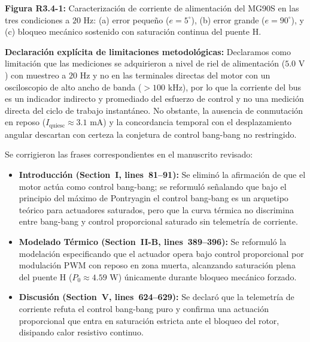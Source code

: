 \documentclass{LabDSTresponse}
\begin{document}
{\begin{center}
    \vspace{0.5em}
    {\small\textbf{Figura R3.4-1:} Caracterización de corriente de alimentación del MG90S en las tres condiciones a $20\text{ Hz}$: (a) error pequeño ($e = 5^\circ$), (b) error grande ($e = 90^\circ$), y (c) bloqueo mecánico sostenido con saturación continua del puente H.}
\end{center}

\textbf{Declaración explícita de limitaciones metodológicas:}
Declaramos como limitación que las mediciones se adquirieron a nivel de riel de alimentación ($5.0\text{ V}$) con muestreo a $20\text{ Hz}$ y no en las terminales directas del motor con un osciloscopio de alto ancho de banda ($> 100\text{ kHz}$), por lo que la corriente del bus es un indicador indirecto y promediado del esfuerzo de control y no una medición directa del ciclo de trabajo instantáneo. No obstante, la ausencia de conmutación en reposo ($I_{\text{quiesc}} \approx 3.1\text{ mA}$) y la concordancia temporal con el desplazamiento angular descartan con certeza la conjetura de control bang-bang no restringido.

Se corrigieron las frases correspondientes en el manuscrito revisado:
\begin{itemize}
    \item \textbf{Introducción (Section~I, lines~81--91):} Se eliminó la afirmación de que el motor actúa como control bang-bang; se reformuló señalando que bajo el principio del máximo de Pontryagin el control bang-bang es un arquetipo teórico para actuadores saturados, pero que la curva térmica no discrimina entre bang-bang y control proporcional saturado sin telemetría de corriente.
    \item \textbf{Modelado Térmico (Section~II-B, lines~389--396):} Se reformuló la modelación especificando que el actuador opera bajo control proporcional por modulación PWM con reposo en zona muerta, alcanzando saturación plena del puente H ($P_0 \approx 4.59\text{ W}$) únicamente durante bloqueo mecánico forzado.
    \item \textbf{Discusión (Section~V, lines~624--629):} Se declaró que la telemetría de corriente refuta el control bang-bang puro y confirma una actuación proporcional que entra en saturación estricta ante el bloqueo del rotor, disipando calor resistivo continuo.
\end{itemize}}
\end{document}
